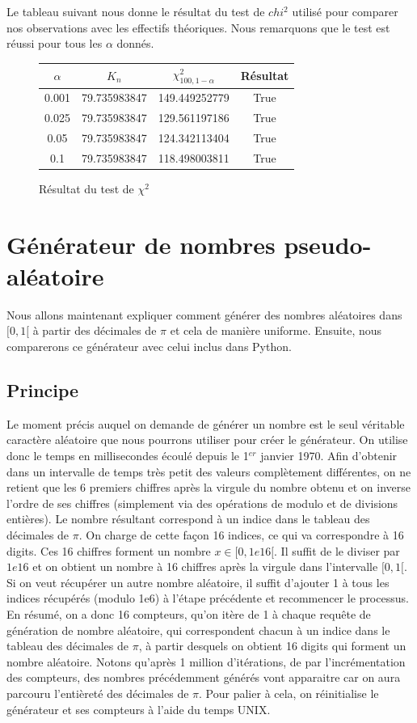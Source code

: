 \documentclass[10pt,a4paper]{article}
\begin{document}
Le tableau suivant nous donne le résultat du test de $chi^2$ utilisé pour comparer nos observations avec les effectifs théoriques. Nous remarquons que le test est réussi pour tous les $\alpha$ donnés.
\begin{figure}[H]
\begin{center}
\begin{tabular}{|c|c|c|c|}
\hline
$\alpha$ & $K_{n}$ & $\chi^2_{100, 1 - \alpha}$ & Résultat\\
\hline
0.001 & 79.735983847 & 149.449252779 & True\\
0.025 & 79.735983847 & 129.561197186 & True\\
0.05 & 79.735983847 & 124.342113404 & True\\
0.1 & 79.735983847 & 118.498003811 & True\\
\hline
\end{tabular}
\end{center}
\caption{Résultat du test de $\chi^2$}
\end{figure} 

\section{Générateur de nombres pseudo-aléatoire}
Nous allons maintenant expliquer comment générer des nombres aléatoires dans $[0, 1[$ à partir des décimales de $\pi$ et cela de manière uniforme. Ensuite, nous comparerons ce générateur avec celui inclus dans Python.
\subsection{Principe}
Le moment précis auquel on demande de générer un nombre est le seul véritable caractère aléatoire que nous pourrons utiliser pour créer le générateur. On utilise donc le temps en millisecondes écoulé depuis le 1$^{er}$ janvier 1970. Afin d'obtenir dans un intervalle de temps très petit des valeurs complètement différentes, on ne retient que les 6 premiers chiffres après la virgule du nombre obtenu et on inverse l'ordre de ses chiffres (simplement via des opérations de modulo et de divisions entières). Le nombre résultant correspond à un indice dans le tableau des décimales de $\pi$. On charge de cette façon 16 indices, ce qui va correspondre à 16 digits. Ces 16 chiffres forment un nombre $x \in [0, 1e16[$. Il suffit de le diviser par $1e16$ et on obtient un nombre à 16 chiffres après la virgule dans l'intervalle $[0, 1[$. Si on veut récupérer un autre nombre aléatoire, il suffit d'ajouter 1 à tous les indices récupérés (modulo 1e6) à l'étape précédente et recommencer le processus. En résumé, on a donc 16 compteurs, qu'on itère de 1 à chaque requête de génération de nombre aléatoire, qui correspondent chacun à un indice dans le tableau des décimales de $\pi$, à partir desquels on obtient 16 digits qui forment un nombre aléatoire. Notons qu'après 1 million d'itérations, de par l'incrémentation des compteurs, des nombres précédemment générés vont apparaitre car on aura parcouru l'entièreté des décimales de $\pi$. Pour palier à cela, on réinitialise le générateur et ses compteurs à l'aide du temps UNIX.\\
\end{document}
